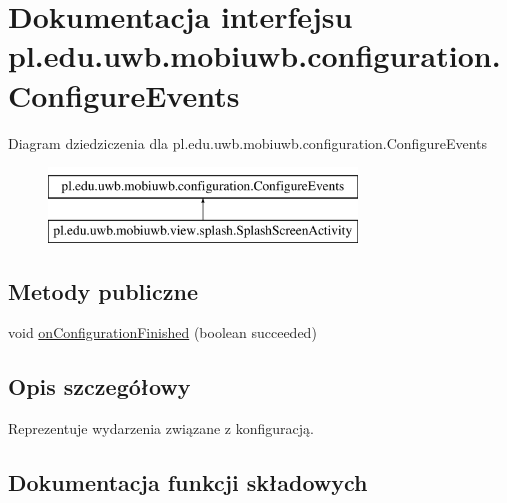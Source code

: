 \hypertarget{interfacepl_1_1edu_1_1uwb_1_1mobiuwb_1_1configuration_1_1_configure_events}{}\section{Dokumentacja interfejsu pl.\+edu.\+uwb.\+mobiuwb.\+configuration.\+Configure\+Events}
\label{interfacepl_1_1edu_1_1uwb_1_1mobiuwb_1_1configuration_1_1_configure_events}
Diagram dziedziczenia dla pl.\+edu.\+uwb.\+mobiuwb.\+configuration.\+Configure\+Events\begin{figure}[H]
\begin{center}
\leavevmode
\includegraphics[height=2.000000cm]{interfacepl_1_1edu_1_1uwb_1_1mobiuwb_1_1configuration_1_1_configure_events}
\end{center}
\end{figure}
\subsection*{Metody publiczne}
\begin{DoxyCompactItemize}
\item 
void \hyperlink{interfacepl_1_1edu_1_1uwb_1_1mobiuwb_1_1configuration_1_1_configure_events_a60cb7efc8772581e530a069cc79b8e49}{on\+Configuration\+Finished} (boolean succeeded)
\end{DoxyCompactItemize}


\subsection{Opis szczegółowy}
Reprezentuje wydarzenia związane z konfiguracją. 

\subsection{Dokumentacja funkcji składowych}
\hypertarget{interfacepl_1_1edu_1_1uwb_1_1mobiuwb_1_1configuration_1_1_configure_events_a60cb7efc8772581e530a069cc79b8e49}{}
